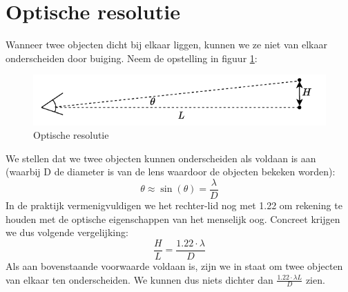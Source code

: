 \documentclass[a4paper,kul]{kulakarticle} %
\begin{document}
\section{Optische resolutie}
Wanneer twee objecten dicht bij elkaar liggen, kunnen we ze niet van elkaar onderscheiden door buiging. Neem de opstelling in figuur \ref{fig:optischeresolutie}:
\begin{figure}[h]
	\centering
	\includegraphics[width=0.7\linewidth]{OptischeResolutie}
	\caption[Optische resolutie]{Optische resolutie}
	\label{fig:optischeresolutie}
\end{figure}
We stellen dat we twee objecten kunnen onderscheiden als voldaan is aan (waarbij D de diameter is van de lens waardoor de objecten bekeken worden):
\begin{equation*}
	\theta\approx\sin(\theta)=\frac{\lambda}{D}
\end{equation*}
In de praktijk vermenigvuldigen we het rechter-lid nog met \num{1.22} om rekening te houden met de optische eigenschappen van het menselijk oog. Concreet krijgen we dus volgende vergelijking:
\begin{equation*}
	\frac{H}{L}= \frac{1.22\cdot \lambda}{D}
\end{equation*}
Als aan bovenstaande voorwaarde voldaan is, zijn we in staat om twee objecten van elkaar ten onderscheiden. We kunnen dus niets dichter dan $\frac{1.22\cdot\lambda L}{D}$ zien. 
\end{document}
